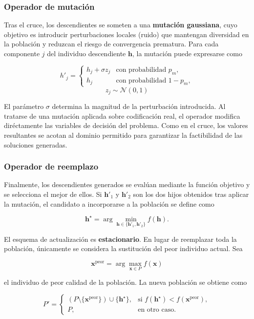 \subsubsection{Operador de mutación}

Tras el cruce, los descendientes se someten a una \textbf{mutación gaussiana}, cuyo objetivo es introducir perturbaciones locales (ruido) que mantengan diversidad en la población y reduzcan el riesgo de convergencia prematura. Para cada componente \(j\) del individuo descendiente \(\mathbf{h}\), la mutación puede expresarse como

\[
    h'_j =
    \begin{cases}
        h_j + \sigma z_j & \text{con probabilidad } p_m,   \\
        h_j              & \text{con probabilidad } 1-p_m,
    \end{cases}
\]
\[
    z_j \sim \mathcal{N}(0,1)
\]

El parámetro \(\sigma\) determina la magnitud de la perturbación introducida. Al tratarse de una mutación aplicada sobre codificación real, el operador modifica diréctamente las variables de decisión del problema. Como en el cruce, los valores resultantes se acotan al dominio permitido para garantizar la factibilidad de las soluciones generadas.

\subsubsection{Operador de reemplazo}


Finalmente, los descendientes generados se evalúan mediante la función objetivo y se selecciona el mejor de ellos. Si \(\mathbf{h}'_1\) y \(\mathbf{h}'_2\) son los dos hijos obtenidos tras aplicar la mutación, el candidato a incorporarse a la población se define como

\[
    \mathbf{h}^{\star}
    =
    \arg\min_{\mathbf{h}\in\{\mathbf{h}'_1,\mathbf{h}'_2\}} f(\mathbf{h}).
\]

El esquema de actualización es \textbf{estacionario}. En lugar de reemplazar toda la población, únicamente se considera la sustitución del peor individuo actual. Sea

\[
    \mathbf{x}^{\text{peor}}
    =
    \arg\max_{\mathbf{x}\in P} f(\mathbf{x})
\]

el individuo de peor calidad de la población. La nueva población se obtiene como

\[
    P' =
    \begin{cases}
        \left(P \setminus \{\mathbf{x}^{\text{peor}}\}\right)\cup\{\mathbf{h}^{\star}\},
         & \text{si } f(\mathbf{h}^{\star}) < f(\mathbf{x}^{\text{peor}}), \\
        P,
         & \text{en otro caso}.
    \end{cases}
\]

